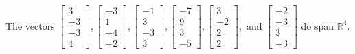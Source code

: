 \begin{exercise}
\begin{exerciseStatement}
  \end{exerciseStatement}
  \begin{exerciseAnswer}
   The vectors \(\left[\begin{array}{r}
3 \\
-3 \\
-3 \\
4
\end{array}\right] , \left[\begin{array}{r}
-3 \\
1 \\
-4 \\
-2
\end{array}\right] , \left[\begin{array}{r}
-1 \\
3 \\
-3 \\
3
\end{array}\right] , \left[\begin{array}{r}
-7 \\
9 \\
3 \\
-5
\end{array}\right] , \left[\begin{array}{r}
3 \\
-2 \\
2 \\
2
\end{array}\right] , \text{ and } \left[\begin{array}{r}
-2 \\
-3 \\
3 \\
-3
\end{array}\right]\) 
  	 do  
	span \(\mathbb{R}^4\).
  


  \end{exerciseAnswer}
\end{exercise}